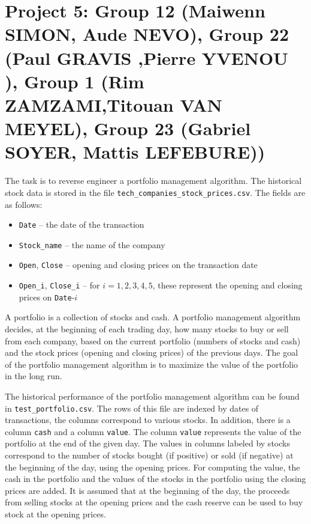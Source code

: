 \documentclass{article}
\begin{document}
\section*{Project 5:  Group 12 (Maiwenn SIMON, Aude NEVO),  Group 22 (Paul GRAVIS ,Pierre YVENOU ), Group 1 (Rim ZAMZAMI,Titouan VAN MEYEL), Group 23 (Gabriel SOYER, Mattis LEFEBURE))}
   The task is to reverse engineer a portfolio management algorithm.
   The historical stock data is stored in the file \lstinline$tech_companies_stock_prices.csv$. The fields are as follows:
   \begin{itemize}
   \item \lstinline$Date$ -- the date of the transaction
   \item \lstinline$Stock_name$ -- the name of the company
   \item \lstinline$Open$, \lstinline$Close$ -- opening and closing prices on the transaction date
   \item \lstinline$Open_i$, \lstinline$Close_i$ -- for $i=1,2,3,4,5$, these represent the opening and closing prices on \lstinline$Date$-$i$
   \end{itemize}

    A portfolio is a collection of stocks and cash. A portfolio management algorithm decides, at the beginning of each trading day, how many stocks to buy or sell from each company,
   based on the current portfolio (numbers of stocks and cash) and the stock prices (opening and closing prices) of the previous days.
   The goal of the portfolio management algorithm is to maximize the value of the portfolio in the long run.


   The historical performance of the portfolio management algorithm can be found in \lstinline$test_portfolio.csv$.
   The rows of this file are indexed by dates of transactions, the columns correspond to various stocks. In addition, there is a
   column \lstinline$cash$ and a column \lstinline$value$. The column \lstinline$value$ represents the value of the portfolio at the end of the given day.
   The values in columns labeled by stocks correspond to the number of stocks bought (if positive) or sold (if negative) at the
   beginning of the day, using the opening prices. For computing the value, the cash in the portfolio and the values of the stocks in the
   portfolio using the closing prices are added.
   It is assumed that at the beginning of the day, the proceeds from selling stocks at the opening prices and the cash reserve
   can be used to buy stock at the opening prices.
\end{document}
